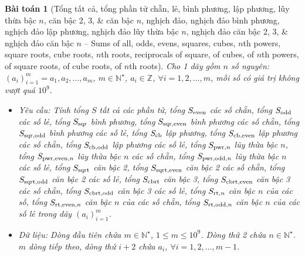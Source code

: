 \documentclass{article}
\newtheorem{baitoan}{Bài toán}
\begin{document}
\begin{baitoan}[Tổng tất cả, tổng phần tử chẵn, lẻ, bình phương, lập phương, lũy thừa bậc $n$, căn bậc 2, 3, \& căn bậc $n$, nghịch đảo, nghịch đảo bình phương, nghịch đảo lập phương, nghịch đảo lũy thừa bậc $n$, nghịch đảo căn bậc 2, 3, \& nghịch đảo căn bậc $n$ -- Sums of all, odds, evens, squares, cubes, $n$th powers, square roots, cube roots, $n$th roots, reciprocals of square, of cubes, of $n$th powers, of square roots, of cube roots, of $n$th roots]
	Cho 1 dãy gồm $n$ số nguyên: $(a_i)_{i=1}^m = a_1,a_2,\ldots,a_m$, $m\in\mathbb{N}^\star$, $a_i\in\mathbb{Z}$, $\forall i = 1,2,\ldots,m$, mỗi số có giá trị không vượt quá $10^9$.
	\begin{itemize}
		\item {\sf Yêu cầu:} Tính tổng $S$ tất cả các phần tử, tổng $S_{\rm even}$ các số chẵn, tổng $S_{\rm odd}$ các số lẻ, tổng $S_{\rm sqr}$ bình phương, tổng $S_{\rm sqr,even}$ bình phương các số chẵn, tổng $S_{\rm sqr,odd}$ bình phương các số lẻ, tổng $S_{\rm cb}$ lập phương, tổng $S_{\rm cb,even}$ lập phương các số chẵn, tổng $S_{\rm cb,odd}$ lập phương các số lẻ, tổng $S_{{\rm pwr},n}$ lũy thừa bậc $n$, tổng $S_{{\rm pwr,even},n}$ lũy thừa bậc $n$ các số chẵn, tổng $S_{{\rm pwr,odd},n}$ lũy thừa bậc $n$ các số lẻ, tổng $S_{\rm sqrt}$ căn bậc 2, tổng $S_{\rm sqrt,even}$ căn bậc 2 các số chẵn, tổng $S_{\rm sqrt,odd}$ căn bậc 2 các số lẻ, tổng $S_{\rm cbrt}$ căn bậc 3, tổng $S_{\rm cbrt,even}$ căn bậc 3 các số chẵn, tổng $S_{\rm cbrt,odd}$ căn bậc 3 các số lẻ, tổng $S_{{\rm rt},n}$ căn bậc $n$ của các số, tổng $S_{{\rm rt,even},n}$ căn bậc $n$ của các số chẵn, tổng $S_{{\rm rt,odd},n}$ căn bậc $n$ của các số lẻ trong dãy $(a_i)_{i=1}^m$.
		\item {\sf Dữ liệu:} Dòng đầu tiên chứa $m\in\mathbb{N}^\star$, $1\le m\le10^9$. Dòng thứ 2 chứa $n\in\mathbb{N}^\star$. $m$ dòng tiếp theo, dòng thứ $i + 2$ chứa $a_i$, $\forall i = 1,2,\ldots,m - 1$.
	\end{itemize}
\end{baitoan}
\end{document}

